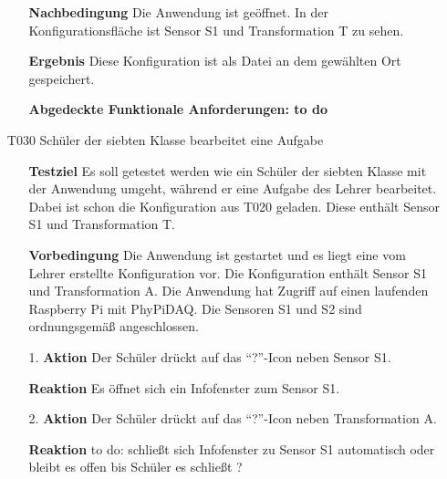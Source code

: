 \documentclass[parskip=full]{scrartcl}
\begin{document}
\begin{itemize}
\begin{itemize}
\item []\textbf{Nachbedingung} Die Anwendung ist geöffnet. In der Konfigurationsfläche ist Sensor S1 und Transformation T zu sehen. 
\item []\textbf{Ergebnis} Diese Konfiguration ist als Datei an dem gewählten Ort gespeichert.

\item []\textbf{Abgedeckte Funktionale Anforderungen: to do}

\end{itemize}

\item[T030] Schüler der siebten Klasse bearbeitet eine Aufgabe
\begin{itemize}

\item []\textbf{Testziel} Es soll getestet werden wie ein Schüler der siebten Klasse mit der Anwendung umgeht, während er eine Aufgabe des Lehrer bearbeitet. Dabei ist schon die Konfiguration aus T020 geladen. Diese enthält Sensor S1 und Transformation T.

\item []\textbf{Vorbedingung} Die Anwendung ist gestartet und es liegt eine vom Lehrer erstellte Konfiguration vor. Die Konfiguration enthält Sensor S1 und Transformation A. Die Anwendung hat Zugriff auf einen laufenden Raspberry Pi mit PhyPiDAQ. Die Sensoren S1 und S2 sind ordnungsgemäß angeschlossen.
\item [1.]\textbf{Aktion} Der Schüler drückt auf das "`?"'-Icon neben Sensor S1.
\item []\textbf{Reaktion} Es öffnet sich ein Infofenster zum Sensor S1.
\item [2.]\textbf{Aktion} Der Schüler drückt auf das "`?"'-Icon neben Transformation A.

\item []\textbf{Reaktion} to do: schließt sich Infofenster zu Sensor S1 automatisch oder bleibt es offen bis Schüler es schließt ?


\end{itemize}
\end{itemize}
\end{document}
